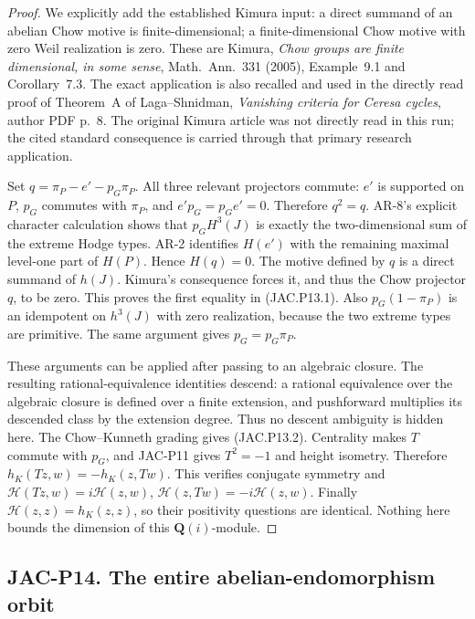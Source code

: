 \begin{proof}
We explicitly add the established Kimura input: a direct summand
of an abelian Chow motive is finite-dimensional; a finite-dimensional
Chow motive with zero Weil realization is zero.
These are Kimura, \emph{Chow groups are finite dimensional, in some
sense}, Math.\ Ann.\ 331 (2005), Example~9.1 and Corollary~7.3.
The exact application is also recalled and used in the directly
read proof of Theorem~A of Laga--Shnidman,
\emph{Vanishing criteria for Ceresa cycles}, author PDF p.~8.
The original Kimura article was not directly read in this run;
the cited standard consequence is carried through that primary
research application.

Set $q=\pi_P-e'-p_G\pi_P$. All three relevant projectors commute:
$e'$ is supported on $P$, $p_G$ commutes with $\pi_P$, and
$e'p_G=p_Ge'=0$. Therefore $q^2=q$.
AR-8's explicit character calculation shows that $p_GH^3(J)$ is
exactly the two-dimensional sum of the extreme Hodge types.
AR-2 identifies $H(e')$ with the remaining maximal level-one
part of $H(P)$. Hence $H(q)=0$.
The motive defined by $q$ is a direct summand of $h(J)$.
Kimura's consequence forces it, and thus the Chow projector $q$,
to be zero. This proves the first equality in (JAC.P13.1).
Also $p_G(1-\pi_P)$ is an idempotent on $h^3(J)$ with zero
realization, because the two extreme types are primitive.
The same argument gives $p_G=p_G\pi_P$.

These arguments can be applied after passing to an algebraic
closure. The resulting rational-equivalence identities descend:
a rational equivalence over the algebraic closure is defined over
a finite extension, and pushforward multiplies its descended class
by the extension degree. Thus no descent ambiguity is hidden here.
The Chow--Kunneth grading gives (JAC.P13.2).
Centrality makes $T$ commute with $p_G$, and JAC-P11 gives
$T^2=-1$ and height isometry. Therefore
$h_K(Tz,w)=-h_K(z,Tw)$.
This verifies conjugate symmetry and
$\mathscr H(Tz,w)=i\mathscr H(z,w)$,
$\mathscr H(z,Tw)=-i\mathscr H(z,w)$.
Finally $\mathscr H(z,z)=h_K(z,z)$, so their positivity questions
are identical. Nothing here bounds the dimension of this
$\mathbf Q(i)$-module.
\end{proof}


\subsection*{JAC-P14. The entire abelian-endomorphism orbit}

